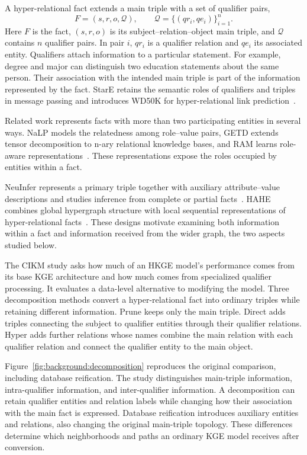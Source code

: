 A hyper-relational fact extends a main triple with a set of qualifier pairs,
\begin{equation}
F=\left(s,r,o,\mathcal{Q}\right),\qquad
\mathcal{Q}=\{(qr_i,qe_i)\}_{i=1}^{n}.
\label{eq:background:hyper-fact}
\end{equation}
Here $F$ is the fact, $(s,r,o)$ is its subject--relation--object main triple, and $\mathcal Q$ contains $n$ qualifier pairs. In pair $i$, $qr_i$ is a qualifier relation and $qe_i$ its associated entity. Qualifiers attach information to a particular statement. For example, degree and major can distinguish two education statements about the same person. Their association with the intended main triple is part of the information represented by the fact. StarE retains the semantic roles of qualifiers and triples in message passing and introduces WD50K for hyper-relational link prediction~\cite{bg-stare}.

Related work represents facts with more than two participating entities in several ways. NaLP models the relatedness among role--value pairs, GETD extends tensor decomposition to n-ary relational knowledge bases, and RAM learns role-aware representations~\cite{lit-guan2019link,lit-liu2020generalizing,lit-liu2021role}. These representations expose the roles occupied by entities within a fact.

NeuInfer represents a primary triple together with auxiliary attribute--value descriptions and studies inference from complete or partial facts~\cite{lit-guan2020neuinfer}. HAHE combines global hypergraph structure with local sequential representations of hyper-relational facts~\cite{lit-luo2023hahe}. These designs motivate examining both information within a fact and information received from the wider graph, the two aspects studied below.

The CIKM study asks how much of an HKGE model's performance comes from its base KGE architecture and how much comes from specialized qualifier processing. It evaluates a data-level alternative to modifying the model. Three decomposition methods convert a hyper-relational fact into ordinary triples while retaining different information. Prune keeps only the main triple. Direct adds triples connecting the subject to qualifier entities through their qualifier relations. Hyper adds further relations whose names combine the main relation with each qualifier relation and connect the qualifier entity to the main object.

Figure~\ref{fig:background:decomposition} reproduces the original comparison, including database reification. The study distinguishes main-triple information, intra-qualifier information, and inter-qualifier information. A decomposition can retain qualifier entities and relation labels while changing how their association with the main fact is expressed. Database reification introduces auxiliary entities and relations, also changing the original main-triple topology. These differences determine which neighborhoods and paths an ordinary KGE model receives after conversion.

